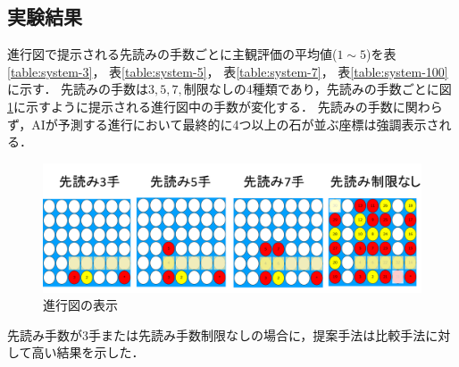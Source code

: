 \subsection{実験結果}
進行図で提示される先読みの手数ごとに主観評価の平均値($1\sim5$)を表\ref{table:system-3}， 表\ref{table:system-5}， 表\ref{table:system-7}， 表\ref{table:system-100}に示す．
先読みの手数は${3, 5, 7, \textrm{制限なし}}$の4種類であり，先読みの手数ごとに図\ref{fig:see}に示すように提示される進行図中の手数が変化する．
先読みの手数に関わらず，AIが予測する進行において最終的に4つ以上の石が並ぶ座標は強調表示される．
\begin{figure}[t]
    \centering
    \includegraphics[width=\linewidth]{./figure/see.png}
	\caption{進行図の表示}
	\label{fig:see}
\end{figure}
先読み手数が3手または先読み手数制限なしの場合に，提案手法は比較手法に対して高い結果を示した．
\begin{table}[H]
    \caption{先読み手数３手の場合}
    \label{table:system-3}
    \scriptsize
    \centering
    
\end{table}
